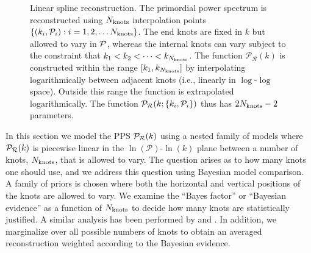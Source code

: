 \begin{figure}[b!]
{
  }
  \caption{%
Linear spline reconstruction. The primordial power spectrum is reconstructed using $N_\mathrm{knots}$ interpolation points
${\{(k_i,\mathcal{P}_{i}):i=1,2,\ldots {N_\mathrm{knots}}\}}$. The end knots are fixed in $k$ but allowed to
vary in ${\mathcal{P}}$, whereas the internal knots can vary subject to the constraint that ${k_1<k_2<\cdots<k_{N_\mathrm{knots}}}$.
The function $\mathcal{P}_\mathcal{R}(k)$ is constructed within the range $[k_1,k_{N_\mathrm{knots}}]$
by interpolating logarithmically between adjacent knots (i.e., linearly in $\log$-$\log$ space). Outside this range the function is extrapolated logarithmically.
The function $\mathcal{P}_\mathcal{R}(k;\{k_i,\mathcal{P}_{i}\})$ thus has $2N_\mathrm{knots}-2$ parameters.
\label{fig:linear_spline_reconstruction}
}
\end{figure}



In this section we model the PPS $\mathcal{P}_\mathcal{R}(k)$ using a nested
family of models where $\mathcal{P}_\mathcal{R}(k)$ is piecewise linear
in the $\ln (\mathcal{P})$-$\ln (k)$ plane
between a number of knots, $N_\mathrm{knots}$,
that is allowed to vary. The question arises as to how many knots one should use,
and we address this question using Bayesian model comparison.
A family of priors
is chosen where both the horizontal and vertical positions of the knots are allowed
to vary. We examine the ``Bayes factor'' or ``Bayesian evidence'' as a function of
$N_\mathrm{knots}$ to decide how many knots are statistically justified. 
A similar analysis has been performed by \cite{vazquez_knots} and \cite{knottedsky1}.
In addition, we marginalize over all possible numbers of knots to obtain 
an averaged reconstruction weighted according to the Bayesian evidence.

